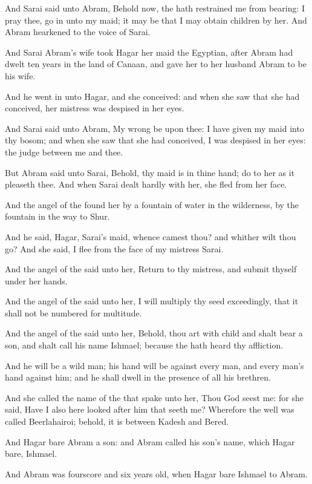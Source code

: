 \verse And Sarai said unto Abram, Behold now, the \LORD hath restrained me from bearing: I pray thee, go in unto my maid; it may be that I may obtain children by her. And Abram hearkened to the voice of Sarai.

\verse And Sarai Abram's wife took Hagar her maid the Egyptian, after Abram had dwelt ten years in the land of Canaan, and gave her to her husband Abram to be his wife.

\verse And he went in unto Hagar, and she conceived: and when she saw that she had conceived, her mistress was despised in her eyes.

\verse And Sarai said unto Abram, My wrong be upon thee: I have given my maid into thy bosom; and when she saw that she had conceived, I was despised in her eyes: the \LORD judge between me and thee.

\verse But Abram said unto Sarai, Behold, thy maid is in thine hand; do to her as it pleaseth thee. And when Sarai dealt hardly with her, she fled from her face.

\verse And the angel of the \LORD found her by a fountain of water in the wilderness, by the fountain in the way to Shur.

\verse And he said, Hagar, Sarai's maid, whence camest thou? and whither wilt thou go? And she said, I flee from the face of my mistress Sarai.

\verse And the angel of the \LORD said unto her, Return to thy mistress, and submit thyself under her hands.

\verse And the angel of the \LORD said unto her, I will multiply thy seed exceedingly, that it shall not be numbered for multitude.

\verse And the angel of the \LORD said unto her, Behold, thou art with child and shalt bear a son, and shalt call his name Ishmael; because the \LORD hath heard thy affliction.

\verse And he will be a wild man; his hand will be against every man, and every man's hand against him; and he shall dwell in the presence of all his brethren.

\verse And she called the name of the \LORD that spake unto her, Thou God seest me: for she said, Have I also here looked after him that seeth me?  \verse Wherefore the well was called Beerlahairoi; behold, it is between Kadesh and Bered.

\verse And Hagar bare Abram a son: and Abram called his son's name, which Hagar bare, Ishmael.

\verse And Abram was fourscore and six years old, when Hagar bare Ishmael to Abram.

